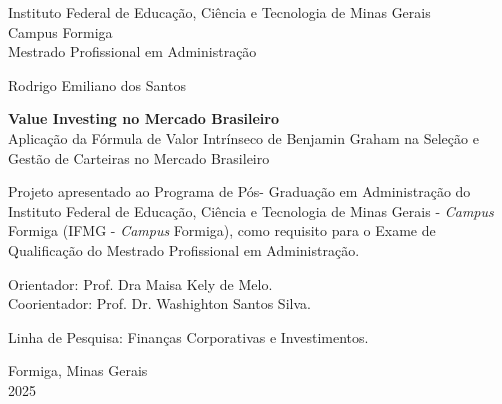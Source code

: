 
\thispagestyle{empty}

\begin{center}
    \small
    \sc Instituto Federal de Educação, Ciência e Tecnologia de Minas Gerais \\ 
    \sc Campus Formiga \\
    \sc Mestrado Profissional em Administração
    
   
    \vspace{3cm}
    \large {Rodrigo Emiliano dos Santos}
    
    \vspace{3cm}
     \large \textbf{Value Investing no Mercado Brasileiro} \\
   Aplicação da Fórmula de Valor Intrínseco de Benjamin Graham na Seleção e Gestão de Carteiras no Mercado Brasileiro
    
    \vspace{2cm}
    \begin{flushright}
    \begin{minipage}{0.6\textwidth}
    \small
    Projeto apresentado ao Programa de Pós-
    Graduação em Administração do Instituto
    Federal de Educação, Ciência e
    Tecnologia de Minas Gerais - \textit{Campus} Formiga 
    (IFMG - \textit{Campus} Formiga), como requisito para 
    o Exame de Qualificação do Mestrado Profissional em 
    Administração.
    \end{minipage}
    \end{flushright}
    
    \vspace{0.5cm}
    \begin{flushright}
    \small
    Orientador: Prof. Dra Maisa Kely de Melo.\\
    Coorientador: Prof. Dr. Washighton Santos Silva.
    
    \vspace{0.5cm}
    Linha de Pesquisa: Finanças Corporativas e Investimentos.
    \end{flushright}
    
    \vfill
    Formiga, Minas Gerais \\
    2025
\end{center}


\newpage

\thispagestyle{empty}

\newenvironment{meuresumo}{
  \clearpage
  \small
  \vspace{-1cm}
  \begin{center}
    \bfseries RESUMO
    \vspace{0.5em}
  \end{center}
  \begin{quote}
}{
  \end{quote}
  \vspace{-1.1em}
  \begin{center}
  \begin{minipage}{0.87\textwidth} 
  \textbf{Palavras-chave:} value investing, valor intrínseco, Benjamin Graham.
  \end{minipage}
  \end{center}
  \clearpage
}

